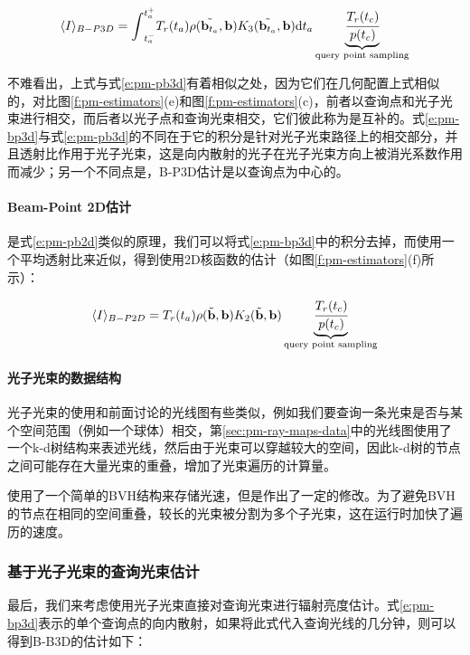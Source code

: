 \begin{equation}\label{e:pm-bp3d}
	\langle I\rangle_{B-P3D}={\rm \int}^{t^{+}_{a}}_{t^{-}_{a}}T_r(t_a) \rho(\tilde{\mathbf{b}_{t_a}},\mathbf{b})K_3(\tilde{\mathbf{b}_{t_a}},\mathbf{b}){\rm d}t_a \underbrace{ \cfrac{T_r(t_c)}{p(t_c)}}_{\text{query point sampling}}
\end{equation}

不难看出，上式与式\ref{e:pm-pb3d}有着相似之处，因为它们在几何配置上式相似的，对比图\ref{f:pm-estimators}(e)和图\ref{f:pm-estimators}(c)，前者以查询点和光子光束进行相交，而后者以光子点和查询光束相交，它们彼此称为是互补的。式\ref{e:pm-bp3d}与式\ref{e:pm-pb3d}的不同在于它的积分是针对光子光束路径上的相交部分，并且透射比作用于光子光束，这是向内散射的光子在光子光束方向上被消光系数作用而减少；另一个不同点是，B-P3D估计是以查询点为中心的。




\paragraph{Beam-Point 2D估计}
是式\ref{e:pm-pb2d}类似的原理，我们可以将式\ref{e:pm-bp3d}中的积分去掉，而使用一个平均透射比来近似，得到使用2D核函数的估计（如图\ref{f:pm-estimators}(f)所示）：

\begin{equation}\label{e:pm-bp2d}
	\langle I\rangle_{B-P2D}=T_r(t_a)\rho(\tilde{\mathbf{b}},\mathbf{b})K_2(\tilde{\mathbf{b}},\mathbf{b})\underbrace{ \cfrac{T_r(t_c)}{p(t_c)}}_{\text{query point sampling}}
\end{equation}




\paragraph{光子光束的数据结构}
光子光束的使用和前面讨论的光线图有些类似，例如我们要查询一条光束是否与某个空间范围（例如一个球体）相交，第\ref{sec:pm-ray-maps-data}中的光线图使用了一个k-d树结构来表述光线，然后由于光束可以穿越较大的空间，因此k-d树的节点之间可能存在大量光束的重叠，增加了光束遍历的计算量。

\cite{a:AComprehensiveTheoryofVolumetricRadianceEstimationusingPhotonPointsandBeams}使用了一个简单的BVH结构来存储光速，但是作出了一定的修改。为了避免BVH的节点在相同的空间重叠，较长的光束被分割为多个子光束，这在运行时加快了遍历的速度。





\subsubsection{基于光子光束的查询光束估计}\label{sec:pm-beam-based-estimator}
最后，我们来考虑使用光子光束直接对查询光束进行辐射亮度估计。式\ref{e:pm-bp3d}表示的单个查询点的向内散射，如果将此式代入查询光线的几分钟，则可以得到B-B3D的估计如下：

